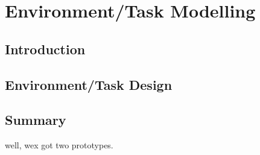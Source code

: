 \chapter{Environment/Task Modelling}\label{chp:environmentTaskModelling}


\section{Introduction}


\section{Environment/Task Design}


\section{Summary}

well, wex got two prototypes.